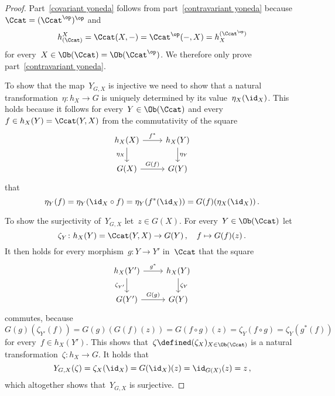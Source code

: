 \begin{proof}
  Part~\ref*{covariant yoneda} follows from part~\ref*{contravariant yoneda} because~$\Ccat = (\Ccat^\op)^\op$ and
  \[
      h^X_{(\Ccat)}
    = \Ccat(X,-)
    = \Ccat^\op(-,X)
    = h_X^{(\Ccat^\op)}
  \]
  for every~$X \in \Ob(\Ccat) = \Ob(\Ccat^\op)$.
  We therefore only prove part~\ref*{contravariant yoneda}.
  
  To show that the map~$Y_{G,X}$ is injective we need to show that a natural transformation~$\eta \colon h_X \to G$ is uniquely determined by its value~$\eta_X(\id_X)$.
  This holds because it follows for every~$Y \in \Ob(\Ccat)$ and every~$f \in h_X(Y) = \Ccat(Y,X)$ from the commutativity of the square
  \[
    \begin{tikzcd}
        h_X(X)
        \arrow{r}[above]{f^*}
        \arrow{d}[left]{\eta_X}
      & h_X(Y)
        \arrow{d}[right]{\eta_Y}
      \\
        G(X)
        \arrow{r}[above]{G(f)}
      & G(Y)
    \end{tikzcd}
  \]
  that
  \[
      \eta_Y(f)
    = \eta_Y({\id_X} \circ f)
    = \eta_Y(f^*(\id_X))
    = G(f)(\eta_X(\id_X)) \,.
  \]
  
  To show the surjectivity of~$Y_{G,X}$ let~$z \in G(X)$.
  For every~$Y \in \Ob(\Ccat)$ let
  \[
            \zeta_Y
    \colon  h_X(Y)
    =       \Ccat(Y,X)
    \to     G(Y) \,,
    \quad   f
    \mapsto G(f)(z) \,.
  \]
  It then holds for every morphism~$g \colon Y \to Y'$ in~$\Ccat$ that the square
  \[
    \begin{tikzcd}
        h_X(Y')
        \arrow{r}[above]{g^*}
        \arrow{d}[left]{\zeta_{Y'}}
      & h_X(Y)
        \arrow{d}[right]{\zeta_Y}
      \\
        G(Y')
        \arrow{r}[above]{G(g)}
      & G(Y)
    \end{tikzcd}
  \]
  commutes, because
  \[
      G(g)( \zeta_{Y'}( f ) )
    = G(g)( G(f)(z) )
    = G(f \circ g)(z)
    = \zeta_Y(f \circ g)
    = \zeta_Y( g^*(f) )
  \]
  for every~$f \in h_X(Y')$.
  This shows that~$\zeta \defined (\zeta_X)_{X \in \Ob(\Ccat)}$ is a natural transformation~$\zeta \colon h_X \to G$.
  It holds that
  \[
      Y_{G,X}(\zeta)
    = \zeta_X(\id_X)
    = G(\id_X)(z)
    = \id_{G(X)}(z)
    = z \,,
  \]
  which altogether shows that~$Y_{G,X}$ is surjective.
\end{proof}


